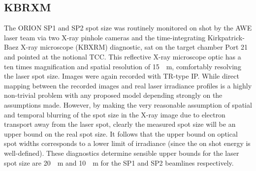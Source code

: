 \subsection{KBRXM}
The ORION SP1 and SP2 spot size was routinely monitored on shot by the AWE laser team via two X-ray pinhole cameras and the time-integrating Kirkpatrick-Baez X-ray microscope (KBXRM) diagnostic, sat on the target chamber Port 21 and pointed at the notional \ac{TCC}. This reflective X-ray microscope optic has a ten times magnification and spatial resolution of \qty{15}{\mu m}, comfortably resolving the laser spot size. Images were again recorded with TR-type IP. While direct mapping between the recorded images and real laser irradiance profiles is a highly non-trivial problem with any proposed model depending strongly on the assumptions made. However, by making the very reasonable assumption of spatial and temporal blurring of the spot size in the X-ray image due to electron transport away from the laser spot, clearly the measured spot size will be an upper bound on the real spot size. It follows that the upper bound on optical spot widths corresponds to a lower limit of irradiance (since the on shot energy is well-defined). These diagnostics determine sensible upper bounds for the laser spot size are \qty{20}{\mu m} and \qty{10}{\mu m} for the SP1 and SP2 beamlines respectively.

